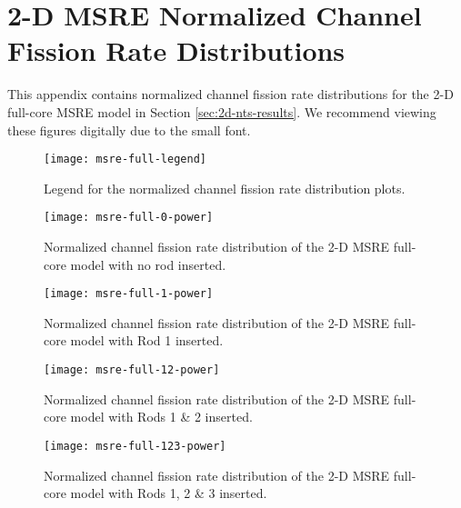\appendix

\section{2-D MSRE Normalized Channel Fission Rate Distributions} \label{chap:2d-fiss-rate}

This appendix contains normalized channel fission rate distributions for the 2-D full-core
\gls{MSRE} model in Section \ref{sec:2d-nts-results}. We recommend viewing these figures digitally
due to the small font.

\begin{figure}[htb!]
  \centering
  \texttt{[image: msre-full-legend]}
  \caption{Legend for the normalized channel fission rate distribution plots.}
  \label{fig:full-legend}
\end{figure}

\begin{figure}[htb!]
  \centering
  \texttt{[image: msre-full-0-power]}
  \caption{Normalized channel fission rate distribution of the 2-D \gls{MSRE} full-core model with
  no rod inserted.}
  \label{fig:0-rod}
\end{figure}

\begin{figure}[htb!]
  \centering
  \texttt{[image: msre-full-1-power]}
  \caption{Normalized channel fission rate distribution of the 2-D \gls{MSRE} full-core model with
  Rod 1 inserted.}
  \label{fig:1-rod}
\end{figure}

\begin{figure}[htb!]
  \centering
  \texttt{[image: msre-full-12-power]}
  \caption{Normalized channel fission rate distribution of the 2-D \gls{MSRE} full-core model with
  Rods 1 \& 2 inserted.}
  \label{fig:12-rod}
\end{figure}

\begin{figure}[htb!]
  \centering
  \texttt{[image: msre-full-123-power]}
  \caption{Normalized channel fission rate distribution of the 2-D \gls{MSRE} full-core model with
  Rods 1, 2 \& 3 inserted.}
  \label{fig:123-rod}
\end{figure}
